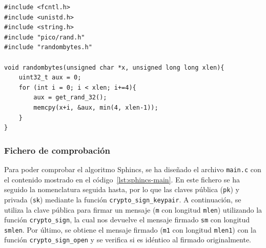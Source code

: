 \begin{lstlisting}[label={lst:sphincs-random},style=Cnice,firstnumber=1,caption={Archivo \texttt{Sphincs/src/randombytes.c}.}]
#include <fcntl.h>
#include <unistd.h>
#include <string.h>
#include "pico/rand.h"
#include "randombytes.h"

void randombytes(unsigned char *x, unsigned long long xlen){
    uint32_t aux = 0;
    for (int i = 0; i < xlen; i+=4){
        aux = get_rand_32();
        memcpy(x+i, &aux, min(4, xlen-1));
    }
}
\end{lstlisting}

\subsubsection{Fichero de comprobación}\label{subsubsec:sphincs-main}

Para poder comprobar el algoritmo Sphincs, se ha diseñado el archivo \texttt{main.c} con el contenido mostrado en el código~\ref{lst:sphincs-main}.
En este fichero se ha seguido la nomenclatura seguida hasta, por lo que las claves pública (\texttt{pk}) y privada (\texttt{sk}) mediante la función \texttt{crypto\_sign\_keypair}.
A continuación, se utiliza la clave pública para firmar un mensaje (\texttt{m} con longitud \texttt{mlen}) utilizando la función \texttt{crypto\_sign}, la cual nos devuelve el mensaje firmado \texttt{sm} con longitud \texttt{smlen}.
Por último, se obtiene el mensaje firmado (\texttt{m1} con longitud \texttt{mlen1}) con la función \texttt{crypto\_sign\_open} y se verifica si es idéntico al firmado originalmente.

